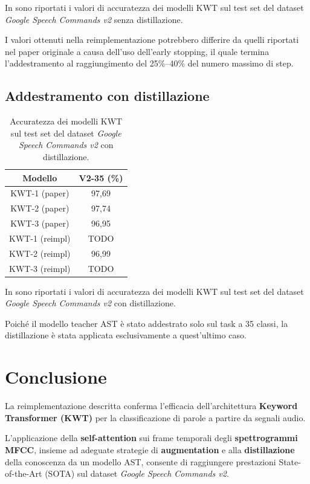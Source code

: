 \documentclass[11pt, a4paper]{article}
\begin{document}
In  sono riportati i valori di accuratezza dei modelli KWT sul test set del dataset \textit{Google Speech Commands v2} senza distillazione.

I valori ottenuti nella reimplementazione potrebbero differire da quelli riportati nel paper originale a causa dell'uso dell'early stopping, il quale termina l'addestramento al raggiungimento del 25\%--40\% del numero massimo di step.

\subsection{Addestramento con distillazione}

\begin{table}
  \center
  \begin{tabular}{cc}
    \toprule
    \textbf{Modello} & \textbf{V2-35 (\%)} \\
    \midrule
    KWT-1 (paper) & 97,69 \\
    KWT-2 (paper) & 97,74 \\
    KWT-3 (paper) & 96,95 \\
    \midrule
    KWT-1 (reimpl) & TODO \\
    KWT-2 (reimpl) & 96,99 \\
    KWT-3 (reimpl) & TODO \\
    \bottomrule
  \end{tabular}
  \caption{Accuratezza dei modelli KWT sul test set del dataset \textit{Google Speech Commands v2} con distillazione.}
  \label{tab:kwt_accuratezza_con_distillazione}
\end{table}

In  sono riportati i valori di accuratezza dei modelli KWT sul test set del dataset \textit{Google Speech Commands v2} con distillazione.

Poiché il modello teacher AST è stato addestrato solo sul task a 35 classi, la distillazione è stata applicata esclusivamente a quest'ultimo caso.

\section{Conclusione}

La reimplementazione descritta conferma l'efficacia dell'architettura \textbf{Keyword Transformer (KWT)} per la classificazione di parole a partire da segnali audio.

L'applicazione della \textbf{self-attention} sui frame temporali degli \textbf{spettrogrammi MFCC}, insieme ad adeguate strategie di \textbf{augmentation} e alla \textbf{distillazione} della conoscenza da un modello AST, consente di raggiungere prestazioni State-of-the-Art (SOTA) sul dataset \textit{Google Speech Commands v2}.



\end{document}
